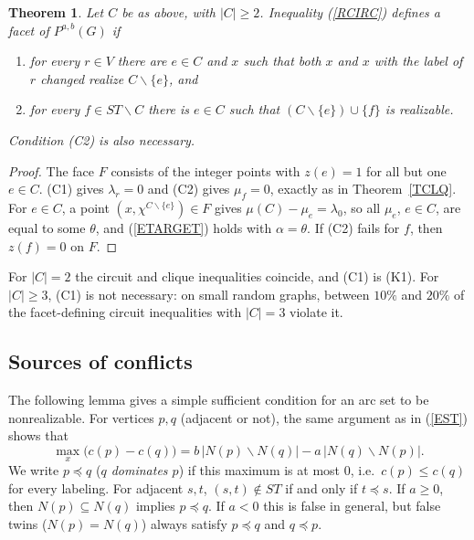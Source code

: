 \documentclass[a4paper,11pt]{article}
\newcommand{\ie}{{i.e.~}}
\newtheorem{thm}{Theorem}
\theoremstyle{definition}
\begin{document}
\begin{thm} \label{TCIRC}
Let $C$ be as above, with $|C| \geq 2$. Inequality (\ref{RCIRC}) defines a facet of $P^{a,b}(G)$ if
\begin{enumerate}
\item[(C1)] for every $r \in V$ there are $e \in C$ and $x$ such that both $x$ and $x$ with the label of $r$ changed realize $C \backslash \{e\}$, and
\item[(C2)] for every $f \in ST \backslash C$ there is $e \in C$ such that $(C \backslash \{e\}) \cup \{f\}$ is realizable.
\end{enumerate}
Condition (C2) is also necessary.
\end{thm}
\begin{proof}
The face $F$ consists of the integer points with $z(e) = 1$ for all but one $e \in C$. (C1) gives $\lambda_r = 0$ and (C2) gives $\mu_f = 0$, exactly as in
Theorem~\ref{TCLQ}. For $e \in C$, a point $(x, \chi^{C \backslash \{e\}}) \in F$ gives $\mu(C) - \mu_e = \lambda_0$, so all $\mu_e$, $e \in C$, are equal
to some $\theta$, and (\ref{ETARGET}) holds with $\alpha = \theta$. If (C2) fails for $f$, then $z(f) = 0$ on $F$.
\end{proof}

For $|C| = 2$ the circuit and clique inequalities coincide, and (C1) is (K1). For $|C| \geq 3$, (C1) is not necessary: on small random graphs,
between $10\%$ and $20\%$ of the facet-defining circuit inequalities with $|C| = 3$ violate it.

\subsection{Sources of conflicts}

The following lemma gives a simple sufficient condition for an arc set to be nonrealizable. For vertices $p, q$ (adjacent or not), the
same argument as in (\ref{EST}) shows that
\begin{equation} \label{EMAX}
\max_{x} \bigl( c(p) - c(q) \bigr) = b\,|N(p) \backslash N(q)| - a\,|N(q) \backslash N(p)|.
\end{equation}
We write $p \preceq q$ (\emph{$q$ dominates $p$}) if this maximum is at most $0$, \ie $c(p) \leq c(q)$ for every labeling. For adjacent $s, t$,
$(s,t) \notin ST$ if and only if $t \preceq s$. If $a \geq 0$, then $N(p) \subseteq N(q)$ implies $p \preceq q$. If $a < 0$ this is false in general,
but false twins ($N(p) = N(q)$) always satisfy $p \preceq q$ and $q \preceq p$.
\end{document}
